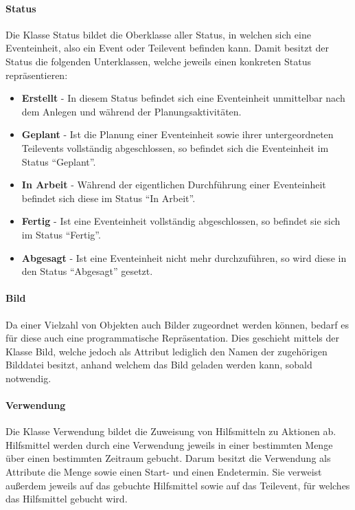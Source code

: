 \paragraph{Status}
Die Klasse Status bildet die Oberklasse aller Status, in welchen sich eine Eventeinheit, also ein Event oder Teilevent befinden kann. Damit besitzt der Status die folgenden Unterklassen, welche jeweils einen konkreten Status repräsentieren:
\begin{itemize}
    \item \textbf{Erstellt} - In diesem Status befindet sich eine Eventeinheit unmittelbar nach dem Anlegen und während der Planungsaktivitäten.
    \item \textbf{Geplant} - Ist die Planung einer Eventeinheit sowie ihrer untergeordneten Teilevents vollständig abgeschlossen, so befindet sich die Eventeinheit im Status \enquote{Geplant}.
    \item \textbf{In Arbeit} - Während der eigentlichen Durchführung einer Eventeinheit befindet sich diese im Status \enquote{In Arbeit}.
    \item \textbf{Fertig} - Ist eine Eventeinheit vollständig abgeschlossen, so befindet sie sich im Status \enquote{Fertig}. 
    \item \textbf{Abgesagt} - Ist eine Eventeinheit nicht mehr durchzuführen, so wird diese in den Status \enquote{Abgesagt} gesetzt.
\end{itemize}

\paragraph{Bild}
Da einer Vielzahl von Objekten auch Bilder zugeordnet werden können, bedarf es für diese auch eine programmatische Repräsentation. Dies geschieht mittels der Klasse Bild, welche jedoch als Attribut lediglich den Namen der zugehörigen Bilddatei besitzt, anhand welchem das Bild geladen werden kann, sobald notwendig.

\paragraph{Verwendung}
Die Klasse Verwendung bildet die Zuweisung von Hilfsmitteln zu Aktionen ab. Hilfsmittel werden durch eine Verwendung jeweils in einer bestimmten Menge über einen bestimmten Zeitraum gebucht. Darum besitzt die Verwendung als Attribute die Menge sowie einen Start- und einen Endetermin. Sie verweist außerdem jeweils auf das gebuchte Hilfsmittel sowie auf das Teilevent, für welches das Hilfsmittel gebucht wird.

